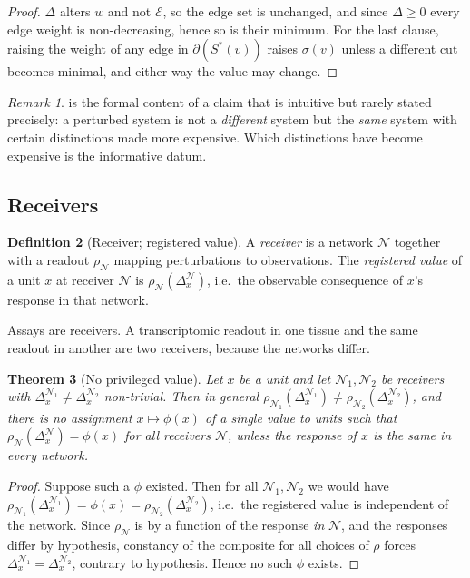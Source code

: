 \documentclass[11pt,twocolumn,a4paper]{article}
\newtheorem{theorem}{Theorem}[section]
\theoremstyle{definition}
\newtheorem{definition}[theorem]{Definition}
\theoremstyle{remark}
\newtheorem{remark}[theorem]{Remark}
\newcommand{\E}{\mathcal{E}}
\newcommand{\wt}{w}
\newcommand{\cut}{\partial}
\newcommand{\sep}{\sigma}
\newcommand{\netw}{\mathcal{N}}
\newcommand{\Perturb}{\Delta}
\begin{document}
\begin{proof}
$\Perturb$ alters $\wt$ and not $\E$, so the edge set is unchanged, and
since $\Perturb\ge0$ every edge weight is non-decreasing, hence so is
their minimum. For the last clause, raising the weight of any edge in
$\cut(S^{*}(v))$ raises $\sep(v)$ unless a different cut becomes
minimal, and either way the value may change.
\end{proof}

\begin{remark}
\label{rem:disease}
 is the formal content of a claim that is
intuitive but rarely stated precisely: a perturbed system is not a
\emph{different} system but the \emph{same} system with certain
distinctions made more expensive. Which distinctions have become expensive
is the informative datum.
\end{remark}

\subsection{Receivers}

\begin{definition}[Receiver; registered value]
\label{def:receiver}
A \emph{receiver} is a network $\netw$ together with a readout
$\rho_\netw$ mapping perturbations to observations. The \emph{registered
value} of a unit $x$ at receiver $\netw$ is
$\rho_\netw(\Perturb^{\netw}_x)$, i.e.\ the observable consequence of
$x$'s response in that network.
\end{definition}

Assays are receivers. A transcriptomic readout in one tissue and the same
readout in another are two receivers, because the networks differ.

\begin{theorem}[No privileged value]
\label{thm:receiver}
Let $x$ be a unit and let $\netw_1,\netw_2$ be receivers with
$\Perturb^{\netw_1}_x\ne\Perturb^{\netw_2}_x$ non-trivial. Then in
general $\rho_{\netw_1}(\Perturb^{\netw_1}_x)\ne
\rho_{\netw_2}(\Perturb^{\netw_2}_x)$, and there is no assignment
$x\mapsto\phi(x)$ of a single value to units such that
$\rho_{\netw}(\Perturb^{\netw}_x)=\phi(x)$ for all receivers $\netw$,
unless the response of $x$ is the same in every network.
\end{theorem}

\begin{proof}
Suppose such a $\phi$ existed. Then for all $\netw_1,\netw_2$ we would
have $\rho_{\netw_1}(\Perturb^{\netw_1}_x)=\phi(x)=
\rho_{\netw_2}(\Perturb^{\netw_2}_x)$, i.e.\ the registered value is
independent of the network. Since $\rho_\netw$ is by
 a function of the response \emph{in} $\netw$, and the
responses differ by hypothesis, constancy of the composite for all choices
of $\rho$ forces $\Perturb^{\netw_1}_x=\Perturb^{\netw_2}_x$, contrary to
hypothesis. Hence no such $\phi$ exists.
\end{proof}
\end{document}
